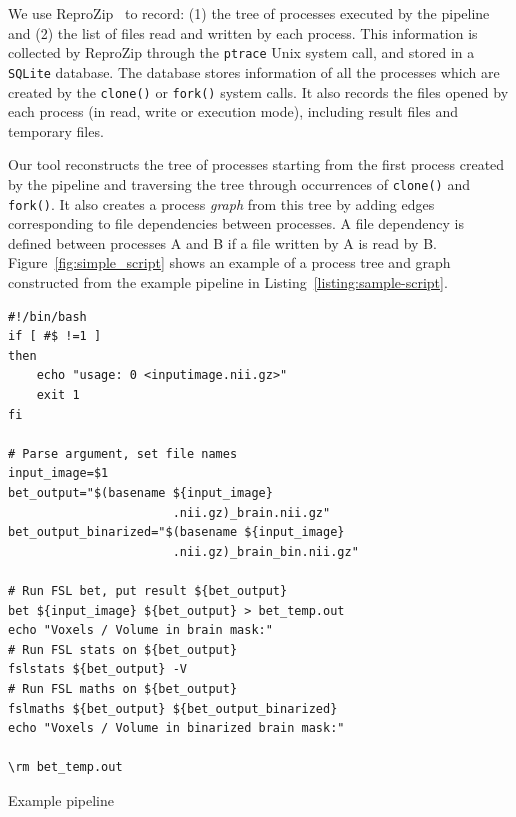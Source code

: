 \documentclass[a4paper,num-refs]{oup-contemporary}
\newcommand{\reprozip}[0]{ReproZip\xspace}
\begin{document}
We use \reprozip~\cite{Chirigati2016} to record: (1) 
the tree of processes executed by the pipeline and (2) the list of 
files read and written by each process. This information is collected 
by \reprozip through the \texttt{ptrace} Unix system 
call, and stored in a \texttt{SQLite} database. The database stores 
information of all the processes which are created by the 
\texttt{clone()} or \texttt{fork()} system calls. It also records the 
files opened by each process (in read, write or execution mode), 
including result files and temporary files.

Our tool reconstructs the tree of processes starting from the first process
created by the pipeline and traversing the tree through occurrences of
\texttt{clone()} and \texttt{fork()}. It also creates a process
\emph{graph} from this tree by adding edges corresponding to file
dependencies between processes. A file dependency is defined between
processes A and B if a file written by A 
is read by B. Figure~\ref{fig:simple_script} shows an example of a 
process tree and graph constructed from the example pipeline in
Listing~\ref{listing:sample-script}.
\begin{listing}
\begin{verbatim}
#!/bin/bash
if [ #$ !=1 ]
then
    echo "usage: 0 <inputimage.nii.gz>"
    exit 1
fi

# Parse argument, set file names
input_image=$1
bet_output="$(basename ${input_image} 
                       .nii.gz)_brain.nii.gz"
bet_output_binarized="$(basename ${input_image} 
                       .nii.gz)_brain_bin.nii.gz"

# Run FSL bet, put result ${bet_output}
bet ${input_image} ${bet_output} > bet_temp.out
echo "Voxels / Volume in brain mask:"
# Run FSL stats on ${bet_output}
fslstats ${bet_output} -V
# Run FSL maths on ${bet_output}
fslmaths ${bet_output} ${bet_output_binarized}
echo "Voxels / Volume in binarized brain mask:"

\rm bet_temp.out
\end{verbatim}
  \caption{Example pipeline}
  \label{listing:sample-script}
\end{listing}
\end{document}
